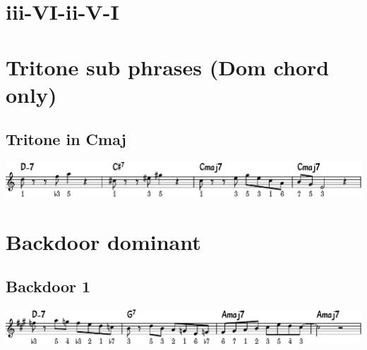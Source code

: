 \documentclass[11pt]{article}
\begin{document}
\section{iii-VI-ii-V-I}
\label{sec:org25b6aa8}
\section{Tritone sub phrases (Dom chord only)}
\label{sec:org421987e}

\subsection{Tritone in Cmaj}
\label{sec:org59d0ace}
\begin{center}
\includegraphics[width=.98\linewidth]{tritone-c-maj.pdf}
\end{center}

\section{Backdoor dominant}
\label{sec:org71b6c1d}

\subsection{Backdoor 1}
\label{sec:orgd3f2d96}
\begin{center}
\includegraphics[width=.98\linewidth]{backdoor-1.pdf}
\end{center}
\end{document}
